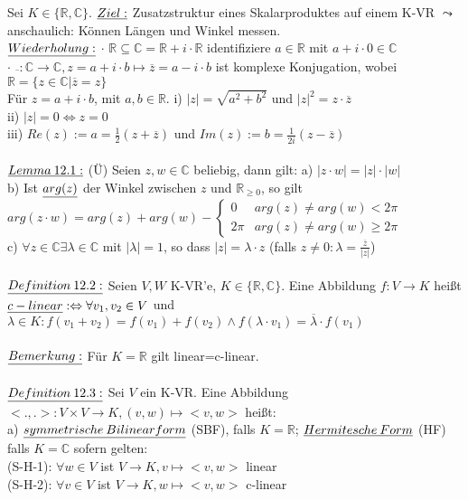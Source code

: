 \documentclass[fleqn, a4paper, 11pt]{scrartcl}
\newcommand{\RR}{\mathbb{R}}
\newcommand{\CC}{\mathbb{C}}
\theoremstyle{definition}
\begin{document}
Sei $K\in\{\RR,\CC\}$. $\uline{Ziel:}$ Zusatzstruktur eines Skalarproduktes auf einem K-VR $\leadsto$anschaulich: Können Längen und Winkel \dq messen\dq.\\
$\uline{Wiederholung:}$ $\cdot$ $\RR\subseteq\CC=\RR+i\cdot\RR$ identifiziere $a\in\RR$ mit $a+i\cdot0\in\CC$\\
$\cdot$ $\overline{}:\CC\rightarrow\CC,z=a+i\cdot b\mapsto\overline{z}=a-i\cdot b$ ist komplexe Konjugation, wobei $\RR=\{z\in\CC|\overline{z}=z\}$\\
Für $z=a+i\cdot b$, mit $a,b\in\RR$. i) $|z|=\sqrt{a^2+b^2}$ und $|z|^2=z\cdot\overline{z}$\\
ii) $|z|=0\Leftrightarrow z=0$\\
iii) $Re(z):=a=\tfrac{1}{2}(z+\overline{z})$ und $Im(z):=b=\tfrac{1}{2i}(z-\overline{z})$\\
\\
$\uline{Lemma\:12.1:}$ (\"U) Seien $z,w\in\CC$ beliebig, dann gilt: a) $|z\cdot w|=|z|\cdot|w|$\\
b) Ist $\uline{arg(z)}$ der Winkel zwischen $z$ und $\RR_{\geq 0}$, so gilt $arg(z\cdot w)=arg(z)+arg(w)-\begin{cases}
	0 & arg(z)\neq arg(w)<2\pi\\
	2\pi & arg(z)\neq arg(w)\geq 2\pi
\end{cases}$\\
c) $\forall z\in\CC\exists\lambda\in\CC$ mit $|\lambda|=1$, so dass $|z|=\lambda\cdot z$ (falls $z\neq 0:\lambda=\tfrac{\overline{z}}{|z|}$)\\
\\
$\uline{Definition\:12.2:}$ Seien $V,W$ K-VR'e, $K\in\{\RR,\CC\}$. Eine Abbildung $f:V\rightarrow K$ heißt $\uline{c-linear}:\Leftrightarrow\forall v_1,v_2\in V$ und $\lambda\in K:f(v_1+v_2)=f(v_1)+f(v_2)\wedge f(\lambda\cdot v_1)=\overline{\lambda}\cdot f(v_1)$\\
\\
$\uline{Bemerkung:}$ Für $K=\RR$ gilt linear=c-linear.\\
\\
$\uline{Definition\:12.3:}$ Sei $V$ ein K-VR. Eine Abbildung $<.,.>:V\times V\rightarrow K,(v,w)\mapsto <v,w>$ heißt:\\
a) $\uline{symmetrische\:Bilinearform}$ (SBF), falls $K=\RR$; $\uline{Hermitesche\:Form}$ (HF) falls $K=\CC$ sofern gelten:\\
(S-H-1): $\forall w\in V$ ist $V\rightarrow K,v\mapsto <v,w>$ linear\\
(S-H-2): $\forall v\in V$ ist $V\rightarrow K,w\mapsto <v,w>$ c-linear\\
\end{document}
